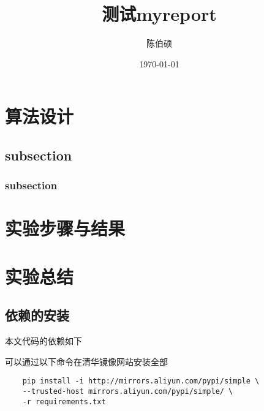 \documentclass[pdfCover]{myreport} %
\title{测试myreport}
\author{陈伯硕}
\date{\today}
\begin{document}
\maketitle
\pagestyle{empty}

\setcounter{section}{3}
\section{算法设计}
\subsection{subsection}
\subsubsection{subsection}

\section{实验步骤与结果}

\section{实验总结}
  


\nocite{alfred_v_aho_compilers_2006}



\begin{appendices}
  \section{依赖的安装}
    本文代码的依赖如下
    
    可以通过以下命令在清华镜像网站安装全部
    \begin{lstlisting}
    pip install -i http://mirrors.aliyun.com/pypi/simple \
    --trusted-host mirrors.aliyun.com/pypi/simple/ \
    -r requirements.txt
    \end{lstlisting}

\end{appendices}
\end{document}
